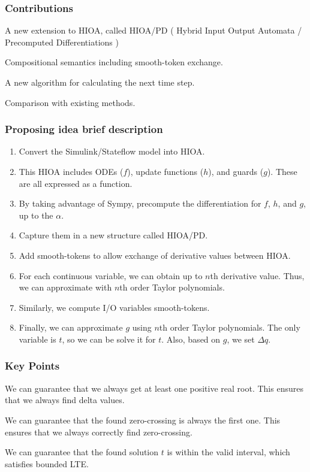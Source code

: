 \begin{frame} \frametitle{Contributions}
	\begin{myitemize}
		\item A new extension to HIOA, called HIOA/PD ( Hybrid Input Output Automata / Precomputed Differentiations )
		\item Compositional semantics including smooth-token exchange.
		\item A new algorithm for calculating the next time step.
		\item Comparison with existing methods.
	\end{myitemize}
\end{frame}

\begin{frame}[c] \frametitle{ Proposing idea brief description }

	\begin{enumerate}
		\item Convert the Simulink/Stateflow model into HIOA.
		\item This HIOA includes ODEs ($f$), update functions ($h$), and guards ($g$). These are all expressed as a function.
		\item By taking advantage of Sympy, precompute the differentiation for $f$, $h$, and $g$, up to the $\alpha$.
		\item Capture them in a new structure called HIOA/PD.
		\item Add smooth-tokens to allow exchange of derivative values between HIOA.
		\item For each continuous variable, we can obtain up to $n$th derivative value. Thus, we can approximate with $n$th order Taylor polynomials.
		\item Similarly, we compute I/O variables smooth-tokens.
		\item Finally, we can approximate $g$ using $n$th order Taylor polynomials. The only variable is $t$, so we can be solve it for $t$. Also, based on $g$, we set $\Delta q$.
	\end{enumerate}

\end{frame}

\begin{frame}[c] \frametitle{ Key Points }

	\begin{myitemize}
		\item We can guarantee that we always get at least one positive real root. This ensures that we always find delta values.
		\item We can guarantee that the found zero-crossing is always the first one. This ensures that we always correctly find zero-crossing.
		\item We can guarantee that the found solution $t$ is within the valid interval, which satisfies bounded LTE.
	\end{myitemize}

\end{frame}

